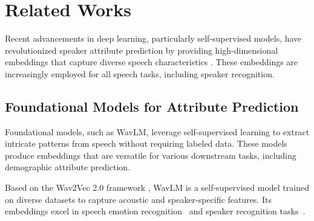 \section{Related Works}
\label{related_work}


Recent advancements in deep learning, particularly self-supervised models, have revolutionized speaker attribute prediction by providing high-dimensional embeddings that capture diverse speech characteristics \cite{baevski2020wav2vec}. These embeddings are increasingly employed for all speech tasks, including speaker recognition.

\subsection{Foundational Models for Attribute Prediction}
Foundational models, such as WavLM, leverage self-supervised learning to extract intricate patterns from speech without requiring labeled data. These models produce embeddings that are versatile for various downstream tasks, including demographic attribute prediction.

Based on the Wav2Vec 2.0 framework \cite{baevski2020wav2vec}, WavLM is a self-supervised model trained on diverse datasets to capture acoustic and speaker-specific features. Its embeddings excel in speech emotion recognition~\cite{wu2024emo} and speaker recognition tasks~\cite{ashihara2024investigation}.


